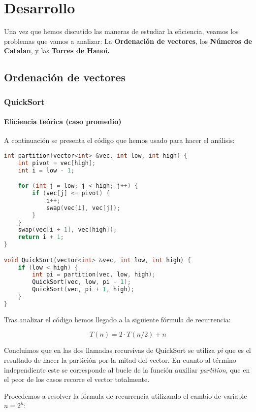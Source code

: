 \documentclass[a4paper,12pt]{article} %
\begin{document}
\section{Desarrollo}
Una vez que hemos discutido las maneras de estudiar la eficiencia, veamos los problemas
que vamos a analizar: La \textbf{Ordenación de vectores},
los \textbf{Números de Catalan}, y las \textbf{Torres de Hanoi.}

\subsection{Ordenación de vectores}
\subsubsection{QuickSort}
\paragraph{Eficiencia teórica (caso promedio)}

A continuación se presenta el código que hemos usado para hacer el análisis:

\begin{lstlisting}[language=C++, caption={Código de QuickSort}]
int partition(vector<int> &vec, int low, int high) {
	int pivot = vec[high];
	int i = low - 1;

	for (int j = low; j < high; j++) {
		if (vec[j] <= pivot) {
			i++;
			swap(vec[i], vec[j]);
		}
	}
	swap(vec[i + 1], vec[high]);
	return i + 1;
}

void QuickSort(vector<int> &vec, int low, int high) {
	if (low < high) {
		int pi = partition(vec, low, high);
		QuickSort(vec, low, pi - 1);
		QuickSort(vec, pi + 1, high);
	}
}
\end{lstlisting}


Tras analizar el código hemos llegado a la siguiente fórmula de recurrencia:

\begin{equation*}
	T(n) = 2\cdot T(n/2) + n
\end{equation*}

Concluimos que en las dos llamadas recursivas de QuickSort
se utiliza \textit{pi} que es el resultado de hacer la partición por la mitad del vector. En cuanto
al término independiente este se corresponde al bucle de la función auxiliar \textit{partition}, que en
el peor de los casos recorre el vector totalmente.

Procedemos a resolver la fórmula de recurrencia utilizando el cambio de variable $n=2^h$:
\end{document}
